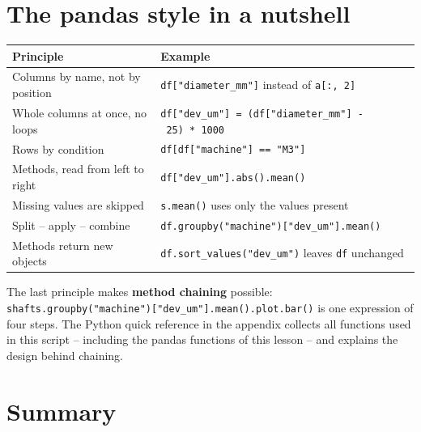 \documentclass[
  letterpaper,
  DIV=11,
  numbers=noendperiod]{scrreprt}
\begin{document}
\section*{The pandas style in a
nutshell}\label{the-pandas-style-in-a-nutshell}


\begin{longtable}[]{@{}
  >{\raggedright\arraybackslash}p{}
  >{\raggedright\arraybackslash}p{}@{}}
\toprule\noalign{}
\begin{minipage}[b]{\linewidth}\raggedright
Principle
\end{minipage} & \begin{minipage}[b]{\linewidth}\raggedright
Example
\end{minipage} \\
\midrule\noalign{}
\endhead
\bottomrule\noalign{}
\endlastfoot
Columns by name, not by position & \texttt{df{[}"diameter\_mm"{]}}
instead of \texttt{a{[}:,\ 2{]}} \\
Whole columns at once, no loops &
\texttt{df{[}"dev\_um"{]}\ =\ (df{[}"diameter\_mm"{]}\ -\ 25)\ *\ 1000} \\
Rows by condition & \texttt{df{[}df{[}"machine"{]}\ ==\ "M3"{]}} \\
Methods, read from left to right &
\texttt{df{[}"dev\_um"{]}.abs().mean()} \\
Missing values are skipped & \texttt{s.mean()} uses only the values
present \\
Split -- apply -- combine &
\texttt{df.groupby("machine"){[}"dev\_um"{]}.mean()} \\
Methods return new objects & \texttt{df.sort\_values("dev\_um")} leaves
\texttt{df} unchanged \\
\end{longtable}

The last principle makes \textbf{method chaining} possible:
\texttt{shafts.groupby("machine"){[}"dev\_um"{]}.mean().plot.bar()} is
one expression of four steps. The Python quick reference in the appendix
collects all functions used in this script -- including the pandas
functions of this lesson -- and explains the design behind chaining.

\section*{Summary}\label{summary}
\end{document}
